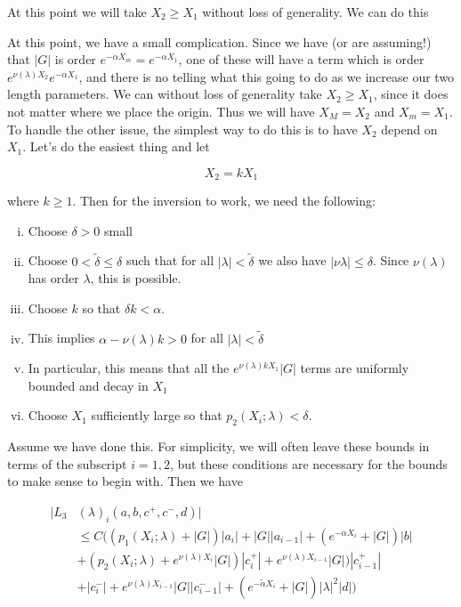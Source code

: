 \documentclass[12pt]{article}
\begin{document}
\begin{enumerate}
At this point we will take $X_2 \geq X_1$ without loss of generality. We can do this 

At this point, we have a small complication. Since we have (or are assuming!) that $|G|$ is order $e^{-\alpha X_m} = e^{-\alpha X_1}$, one of these will have a term which is order $e^{\nu(\lambda)X_2} e^{-\alpha X_1}$, and there is no telling what this going to do as we increase our two length parameters. We can without loss of generality take $X_2 \geq X_1$, since it does not matter where we place the origin. Thus we will have $X_M = X_2$ and $X_m = X_1$. To handle the other issue, the simplest way to do this is to have $X_2$ depend on $X_1$. Let's do the easiest thing and let

\[
X_2 = k X_1
\]

where $k \geq 1$. Then for the inversion to work, we need the following:

\begin{enumerate}[(i)]
\item Choose $\delta > 0$ small
\item Choose $0 < \tilde{\delta} \leq \delta$ such that for all $|\lambda| < \tilde{\delta}$ we also have $|\nu{\lambda}| \leq \delta$. Since $\nu(\lambda)$ has order $\lambda$, this is possible.
\item Choose $k$ so that $\delta k < \alpha$. 
\item This implies $\alpha - \nu(\lambda) k > 0$ for all $|\lambda| < \tilde{\delta}$
\item In particular, this means that all the $e^{\nu(\lambda)k X_1} |G|$ terms are uniformly bounded and decay in $X_1$
\item Choose $X_1$ sufficiently large so that $p_2(X_i; \lambda) < \delta$.
\end{enumerate}

Assume we have done this. For simplicity, we will often leave these bounds in terms of the subscript $i = 1, 2$, but these conditions are necessary for the bounds to make sense to begin with. Then we have

\begin{align*}
|L_3&(\lambda)_i(a, b, c^+, c^-, d)| \\
&\leq C \Big( (p_1(X_i; \lambda) + |G|)|a_i| + |G||a_{i-1}| + (e^{-\alpha X_i} + |G|) |b| \\
&+ ( p_2(X_i; \lambda) + e^{\nu(\lambda)X_i} |G|) |c_i^+| + e^{\nu(\lambda)X_{i-1}} |G|) |c_{i-1}^+| \\
&+ |c_i^-| + e^{\nu(\lambda)X_{i-1}} |G||c_{i-1}^-| + (e^{-\tilde{\alpha} X_i} + |G|) |\lambda|^2 |d| \Big)
\end{align*} 


\end{enumerate}
\end{document}
